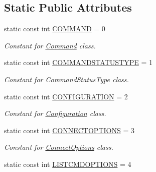 \subsection*{Static Public Attributes}
\begin{DoxyCompactItemize}
\item 
\hypertarget{classUMS__Data_1_1UMS__DataPackage_afa66c0babc56cb7834cbcbb3fcca1f25}{
static const int \hyperlink{classUMS__Data_1_1UMS__DataPackage_afa66c0babc56cb7834cbcbb3fcca1f25}{COMMAND} = 0}
\label{classUMS__Data_1_1UMS__DataPackage_afa66c0babc56cb7834cbcbb3fcca1f25}

\begin{DoxyCompactList}\small\item\em Constant for \hyperlink{classUMS__Data_1_1Command}{Command} class. \item\end{DoxyCompactList}\item 
\hypertarget{classUMS__Data_1_1UMS__DataPackage_a98ea2c87fc2c3b4561addb86c7aae35c}{
static const int \hyperlink{classUMS__Data_1_1UMS__DataPackage_a98ea2c87fc2c3b4561addb86c7aae35c}{COMMANDSTATUSTYPE} = 1}
\label{classUMS__Data_1_1UMS__DataPackage_a98ea2c87fc2c3b4561addb86c7aae35c}

\begin{DoxyCompactList}\small\item\em Constant for CommandStatusType class. \item\end{DoxyCompactList}\item 
\hypertarget{classUMS__Data_1_1UMS__DataPackage_af6bd106b332c2d0786cf00fea4371536}{
static const int \hyperlink{classUMS__Data_1_1UMS__DataPackage_af6bd106b332c2d0786cf00fea4371536}{CONFIGURATION} = 2}
\label{classUMS__Data_1_1UMS__DataPackage_af6bd106b332c2d0786cf00fea4371536}

\begin{DoxyCompactList}\small\item\em Constant for \hyperlink{classUMS__Data_1_1Configuration}{Configuration} class. \item\end{DoxyCompactList}\item 
\hypertarget{classUMS__Data_1_1UMS__DataPackage_a40f72b37430844e00f79cfa43e78d7c4}{
static const int \hyperlink{classUMS__Data_1_1UMS__DataPackage_a40f72b37430844e00f79cfa43e78d7c4}{CONNECTOPTIONS} = 3}
\label{classUMS__Data_1_1UMS__DataPackage_a40f72b37430844e00f79cfa43e78d7c4}

\begin{DoxyCompactList}\small\item\em Constant for \hyperlink{classUMS__Data_1_1ConnectOptions}{ConnectOptions} class. \item\end{DoxyCompactList}\item 
\hypertarget{classUMS__Data_1_1UMS__DataPackage_a5f1367ab8a245bdf122cb4ea1ca4bec9}{
static const int \hyperlink{classUMS__Data_1_1UMS__DataPackage_a5f1367ab8a245bdf122cb4ea1ca4bec9}{LISTCMDOPTIONS} = 4}
\label{classUMS__Data_1_1UMS__DataPackage_a5f1367ab8a245bdf122cb4ea1ca4bec9}


\end{DoxyCompactItemize}
